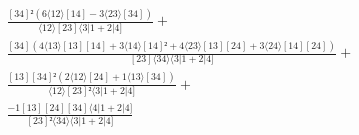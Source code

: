 \documentclass[varwidth, border=5pt]{standalone}
\begin{document}
\begin{my}
$\begin{gathered}
\scriptscriptstyle\frac{[34]²(6⟨12⟩[14]-3⟨23⟩[34])}{⟨12⟩[23]⟨3|1+2|4]} +\\
\scriptscriptstyle\frac{[34](4⟨13⟩[13][14]+3⟨14⟩[14]²+4⟨23⟩[13][24]+3⟨24⟩[14][24])}{[23]⟨34⟩⟨3|1+2|4]} +\\
\scriptscriptstyle\frac{[13][34]²(2⟨12⟩[24]+1⟨13⟩[34])}{⟨12⟩[23]²⟨3|1+2|4]} +\\
\scriptscriptstyle\frac{-1[13][24][34]⟨4|1+2|4]}{[23]²⟨34⟩⟨3|1+2|4]} \phantom{+}
\end{gathered}$
\end{my}
\end{document}
